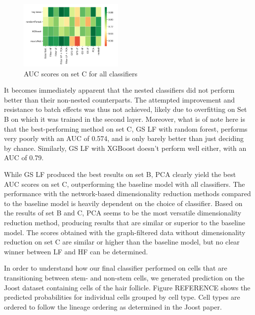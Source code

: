 \documentclass[10pt,conference,compsocconf]{IEEEtran}
\begin{document}
\begin{figure}[H]
	\centering
	\includegraphics[width=0.45\textwidth]{test_auc.png}
	\caption{AUC scores on set C for all classifiers }
	\label{fig:test_acc}
\end{figure}
It becomes immediately apparent that the nested classifiers did not perform better than their non-nested counterparts. The attempted improvement and resistance to batch effects was thus not achieved, likely due to overfitting on Set B on which it was trained in the second layer. Moreover, what is of note here is that the best-performing method on set C, GS LF with random forest, performs very poorly with an AUC of 0.574, and is only barely better than just deciding by chance. Similarly, GS LF with XGBoost doesn't perform well either, with an AUC of 0.79. 


While GS LF produced the best results on set B, PCA clearly yield the best AUC scores on set C, outperforming the baseline model with all classifiers. The performance with the network-based dimensionality reduction methods compared to the baseline model is heavily dependent on the choice of classifier. 
Based on the results of set B and C, PCA seems to be the most versatile dimensionality reduction method, producing results that are similar or superior to the baseline model. The scores obtained with the graph-filtered data without dimensionality reduction on set C are similar or higher than the baseline model, but no clear winner between LF and HF can be determined. 
\par
In order to understand how our final classifier performed on cells that are transitioning between stem- and non-stem cells, we generated prediction on the Joost dataset containing cells of the hair follicle. Figure REFERENCE shows the predicted probabilities for individual cells grouped by cell type. Cell types are ordered to follow the lineage ordering as determined in the Joost paper. 
\end{document}
